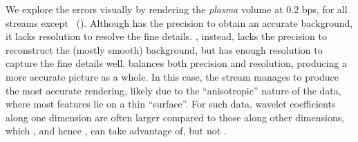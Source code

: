 We explore the errors visually by rendering the \emph{plasma} volume at 0.2 bps, for all streams
except \srop ~(). Although \slvl has the precision to obtain an accurate
background, it lacks resolution to resolve the fine details. \sbit, instead, lacks the precision to
reconstruct the (mostly smooth) background, but has enough resolution to capture the fine details
well. \swav balances both precision and resolution, producing a more accurate picture as a whole. In
this case, the \ssig stream manages to produce the most accurate rendering, likely due to the
``anisotropic'' nature of the data, where most features lie on a thin ``surface''. For such data,
wavelet coefficients along one dimension are often larger compared to those along other dimensions,
which \srop, and hence \srsg, can take advantage of, but not \swav.
